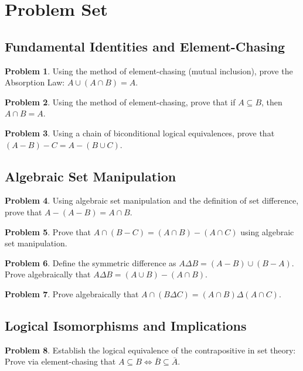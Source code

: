 \documentclass[12pt]{article}
\theoremstyle{definition}
\newtheorem{problem}{Problem}
\begin{document}
\newpage

\section{Problem Set}
\label{sec:problems}

\subsection{Fundamental Identities and Element-Chasing}
\begin{problem}
Using the method of element-chasing (mutual inclusion), prove the Absorption Law: $A \cup (A \cap B) = A$.
\end{problem}

\begin{problem}
Using the method of element-chasing, prove that if $A \subseteq B$, then $A \cap B = A$.
\end{problem}

\begin{problem}
Using a chain of biconditional logical equivalences, prove that $(A - B) - C = A - (B \cup C)$.
\end{problem}

\subsection{Algebraic Set Manipulation}
\begin{problem}
Using algebraic set manipulation and the definition of set difference, prove that $A - (A - B) = A \cap B$.
\end{problem}

\begin{problem}
Prove that $A \cap (B - C) = (A \cap B) - (A \cap C)$ using algebraic set manipulation.
\end{problem}

\begin{problem}
Define the symmetric difference as $A \Delta B = (A - B) \cup (B - A)$. Prove algebraically that $A \Delta B = (A \cup B) - (A \cap B)$.
\end{problem}

\begin{problem}
Prove algebraically that $A \cap (B \Delta C) = (A \cap B) \Delta (A \cap C)$.
\end{problem}

\subsection{Logical Isomorphisms and Implications}
\begin{problem}
Establish the logical equivalence of the contrapositive in set theory: Prove via element-chasing that $A \subseteq B \iff \overline{B} \subseteq \overline{A}$.
\end{problem}
\end{document}
